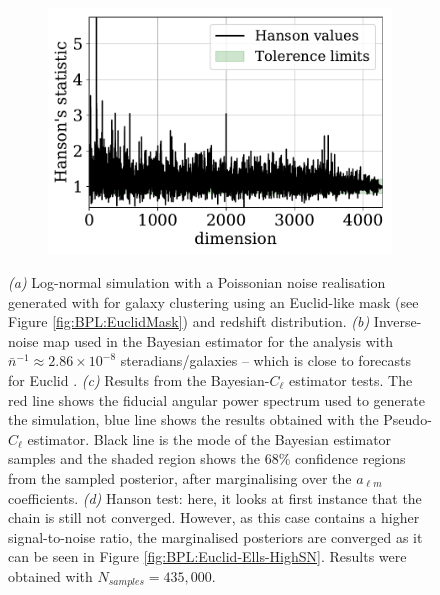 \begin{figure}
\begin{subfigure}{.5\textwidth}
  \caption{}
  \label{fig:BPL:LN-HighSN-Cls}
\end{subfigure}
\begin{subfigure}{.5\textwidth}
  \centering
  \includegraphics[scale=0.50]{BPL-FIGS/Euclid-LN-PNoi-N32-HDens_Hanson.pdf}
  \caption{}
  \label{fig:BPL:LN-HighSN-Hanson}
\end{subfigure}
\caption[Bayesian-$C_{\ell}$ estimator tested on a Euclid-like \flask log-normal simulation with signal-to-noise similar to Euclid's.]{\textit{(a)} Log-normal simulation with a Poissonian noise realisation generated with \flask for galaxy clustering using an Euclid-like mask (see Figure \ref{fig:BPL:EuclidMask}) and redshift distribution. \textit{(b)} Inverse-noise map used in the Bayesian estimator for the analysis with $\bar{n}^{-1}\approx 2.86\times 10^{-8}$ steradians/galaxies -- which is close to forecasts for Euclid \citep{2011EuclidRedPaper,2017EuclidLSST}. \textit{(c)} Results from the Bayesian-$C_{\ell}$ estimator tests. The red line shows the fiducial angular power spectrum used to generate the simulation, blue line shows the results obtained with the Pseudo-$C_{\ell}$ estimator. Black line is the mode of the Bayesian estimator samples and the shaded region shows the 68\% confidence regions from the sampled posterior, after marginalising over the $a_{\ell m}$ coefficients. \textit{(d)} Hanson test: here, it looks at first instance that the chain is still not converged. However, as this case contains a higher signal-to-noise ratio, the marginalised posteriors are converged as it can be seen in Figure \ref{fig:BPL:Euclid-Ells-HighSN}. Results were obtained with $N_{samples} = 435,000$.}
\label{fig:BPL:LogNormalFSAnalysisHighSN}
\end{figure}


